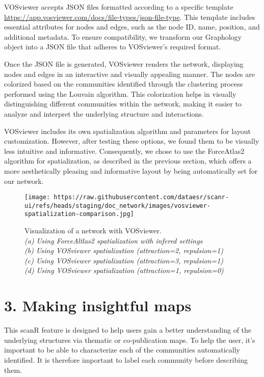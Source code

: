 \documentclass[
]{article}
\begin{document}
VOSviewer accepts JSON files formatted according to a specific template
\url{https://app.vosviewer.com/docs/file-types/json-file-type}. This
template includes essential attributes for nodes and edges, such as the
node ID, name, position, and additional metadata. To ensure
compatibility, we transform our Graphology object into a JSON file that
adheres to VOSviewer's required format.

Once the JSON file is generated, VOSviewer renders the network,
displaying nodes and edges in an interactive and visually appealing
manner. The nodes are colorized based on the communities identified
through the clustering process performed using the Louvain algorithm.
This colorization helps in visually distinguishing different communities
within the network, making it easier to analyze and interpret the
underlying structure and interactions.

VOSviewer includes its own spatialization algorithm and parameters for
layout customization. However, after testing these options, we found
them to be visually less intuitive and informative. Consequently, we
chose to use the ForceAtlas2 algorithm for spatialization, as described
in the previous section, which offers a more aesthetically pleasing and
informative layout by being automatically set for our network.

\begin{figure}
\centering
\texttt{[image: https://raw.githubusercontent.com/dataesr/scanr-ui/refs/heads/staging/doc\_network/images/vosviewer-spatialization-comparison.jpg]}
\caption{Visualization of a network with VOSviewer.\\
\emph{(a) Using ForceAltlas2 spatialization with infered settings\\
(b) Using VOSviewer spatialization (attraction=2, repulsion=1)\\
(c) Using VOSviewer spatialization (attraction=3, repulsion=1)\\
(d) Using VOSviewer spatialization (attraction=1, repulsion=0)}}
\end{figure}

\hypertarget{making-insightful-maps}{%
\section{3. Making insightful maps}\label{making-insightful-maps}}

This scanR feature is designed to help users gain a better understanding
of the underlying structures via thematic or co-publication maps. To
help the user, it's important to be able to characterize each of the
communities automatically identified. It is therefore important to label
each community before describing them.
\end{document}
